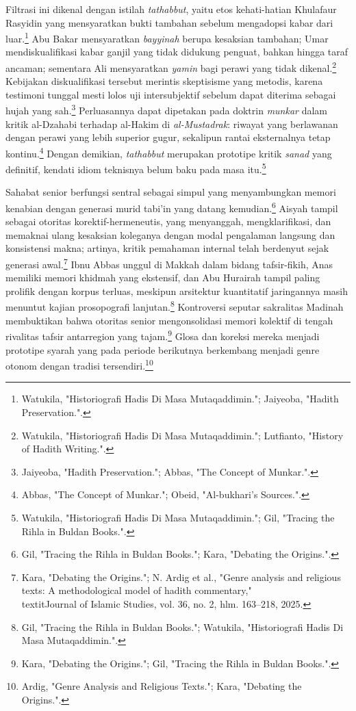 Filtrasi ini dikenal dengan istilah \textit{tathabbut}, yaitu etos kehati-hatian Khulafaur Rasyidin yang mensyaratkan bukti tambahan sebelum mengadopsi kabar dari luar.\footnote{Watukila, "Historiografi Hadis Di Masa Mutaqaddimin."; Jaiyeoba, "Hadith Preservation.".} Abu Bakar mensyaratkan \textit{bayyinah} berupa kesaksian tambahan; Umar mendiskualifikasi kabar ganjil yang tidak didukung penguat, bahkan hingga taraf ancaman; sementara Ali mensyaratkan \textit{yamin} bagi perawi yang tidak dikenal.\footnote{Watukila, "Historiografi Hadis Di Masa Mutaqaddimin."; Lutfianto, "History of Hadith Writing.".} Kebijakan diskualifikasi tersebut merintis skeptisisme yang metodis, karena testimoni tunggal mesti lolos uji intersubjektif sebelum dapat diterima sebagai hujah yang sah.\footnote{Jaiyeoba, "Hadith Preservation."; Abbas, "The Concept of Munkar.".} Perluasannya dapat dipetakan pada doktrin \textit{munkar} dalam kritik al-Dzahabi terhadap al-Hakim di \textit{al-Mustadrak}: riwayat yang berlawanan dengan perawi yang lebih superior gugur, sekalipun rantai eksternalnya tetap kontinu.\footnote{Abbas, "The Concept of Munkar."; Obeid, "Al-bukhari's Sources.".} Dengan demikian, \textit{tathabbut} merupakan prototipe kritik \textit{sanad} yang definitif, kendati idiom teknisnya belum baku pada masa itu.\footnote{Watukila, "Historiografi Hadis Di Masa Mutaqaddimin."; Gil, "Tracing the Rihla in Buldan Books.".}

Sahabat senior berfungsi sentral sebagai simpul yang menyambungkan memori kenabian dengan generasi murid tabi'in yang datang kemudian.\footnote{Gil, "Tracing the Rihla in Buldan Books."; Kara, "Debating the Origins.".} Aisyah tampil sebagai otoritas korektif-hermeneutis, yang menyanggah, mengklarifikasi, dan memaknai ulang kesaksian koleganya dengan modal pengalaman langsung dan konsistensi makna; artinya, kritik pemahaman internal telah berdenyut sejak generasi awal.\footnote{Kara, "Debating the Origins."; N. Ardig et al., "Genre analysis and religious texts: A methodological model of hadith commentary," \\textit{Journal of Islamic Studies}, vol. 36, no. 2, hlm. 163--218, 2025.} Ibnu Abbas unggul di Makkah dalam bidang tafsir-fikih, Anas memiliki memori khidmah yang ekstensif, dan Abu Hurairah tampil paling prolifik dengan korpus terluas, meskipun arsitektur kuantitatif jaringannya masih menuntut kajian prosopografi lanjutan.\footnote{Gil, "Tracing the Rihla in Buldan Books."; Watukila, "Historiografi Hadis Di Masa Mutaqaddimin.".} Kontroversi seputar sakralitas Madinah membuktikan bahwa otoritas senior mengonsolidasi memori kolektif di tengah rivalitas tafsir antarregion yang tajam.\footnote{Kara, "Debating the Origins."; Gil, "Tracing the Rihla in Buldan Books.".} Glosa dan koreksi mereka menjadi prototipe syarah yang pada periode berikutnya berkembang menjadi genre otonom dengan tradisi tersendiri.\footnote{Ardig, "Genre Analysis and Religious Texts."; Kara, "Debating the Origins.".}

